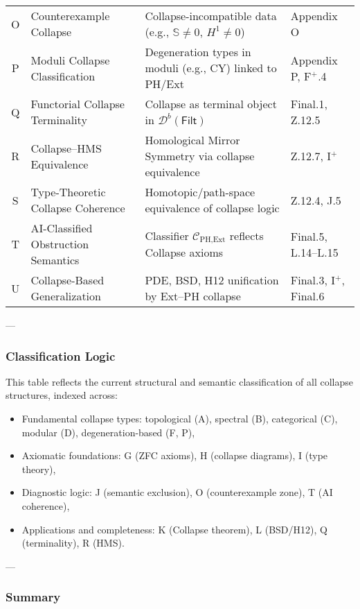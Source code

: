 \documentclass[11pt]{article}
\newcommand{\Sha}{\mathbb{S}}
\begin{document}
\begin{axiom}
\begin{axiom}
{{\begin{center}
\begin{tabularx}{\textwidth}{|c|X|X|X|}
O & Counterexample Collapse & Collapse-incompatible data (e.g., $\Sha \neq 0$, $H^1 \neq 0$) & Appendix O \\
P & Moduli Collapse Classification & Degeneration types in moduli (e.g., CY) linked to PH/Ext & Appendix P, F$^+$.4 \\
Q & Functorial Collapse Terminality & Collapse as terminal object in $\mathcal{D}^b(\mathsf{Filt})$ & Final.1, Z.12.5 \\
R & Collapse–HMS Equivalence & Homological Mirror Symmetry via collapse equivalence & Z.12.7, I$^+$ \\
S & Type-Theoretic Collapse Coherence & Homotopic/path-space equivalence of collapse logic & Z.12.4, J.5 \\
T & AI-Classified Obstruction Semantics & Classifier $\mathcal{C}_{\text{PH,Ext}}$ reflects Collapse axioms & Final.5, L.14–L.15 \\
U & Collapse-Based Generalization & PDE, BSD, H12 unification by Ext–PH collapse & Final.3, I$^+$, Final.6 \\
\hline
\end{tabularx}
\end{center}

---

\subsubsection*{Classification Logic}

This table reflects the current structural and semantic classification of all collapse structures,  
indexed across:

\begin{itemize}
  \item Fundamental collapse types: topological (A), spectral (B), categorical (C), modular (D), degeneration-based (F, P),
  \item Axiomatic foundations: G (ZFC axioms), H (collapse diagrams), I (type theory),
  \item Diagnostic logic: J (semantic exclusion), O (counterexample zone), T (AI coherence),
  \item Applications and completeness: K (Collapse theorem), L (BSD/H12), Q (terminality), R (HMS).
\end{itemize}

---

\subsubsection*{Summary}

}}
\end{axiom}
\end{axiom}
\end{document}
